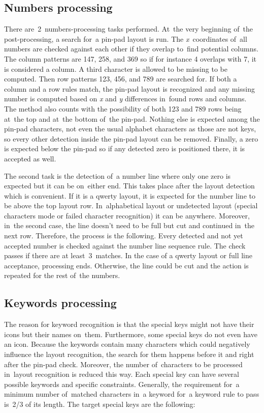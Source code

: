 \subsection{Numbers processing}
\label{postprocessing-numbers}
There are~2~numbers-processing tasks performed. At~the very beginning of~the post-processing, a search for~a pin-pad layout is run. The \emph{x}~coordinates of~all numbers are checked against each other if they overlap to~find potential columns. The column patterns are 147, 258, and 369 so if for instance 4 overlaps with 7, it is considered a column. A third character is allowed to be missing to be computed. Then row patterns 123, 456, and 789 are searched for. If both a column and a row rules match, the pin-pad layout is recognized and any missing number is computed based on \emph{x} and \emph{y} differences in~found rows and columns. The method also counts with the possibility of both 123 and 789 rows being at~the top and at~the bottom of~the pin-pad. Nothing else is expected among the pin-pad characters, not even the usual alphabet characters as those are not keys, so every other detection inside the pin-pad layout can be removed. Finally, a zero is expected below the pin-pad so if any detected zero is positioned there, it is accepted as well.

The second task is the detection of~a number line  where only one zero is expected but it can be on~either end. This takes place after the layout detection which is convenient. If it is a qwerty layout, it is expected for the number line to be above the top layout row. In~alphabetical layout or undetected layout (special characters mode or failed character recognition) it can be anywhere. Moreover, in~the second case, the line doesn't need to be full but cut and continued in~the next row. Therefore, the process is the following. Every detected and not yet accepted number is checked against the number line sequence rule. The check passes if there are at least~3~matches. In the case of a qwerty layout or full line acceptance, processing ends. Otherwise, the line could be cut and the action is repeated for the rest of~the numbers.

\subsection{Keywords processing}
\label{postprocessing-keywords}
The reason for keyword recognition is that the special keys might not have their icons but their names on~them. Furthermore, some special keys do not even have an icon. Because the keywords contain many characters which could negatively influence the layout recognition, the search for them happens before it and right after the pin-pad check. Moreover, the number of~characters to be processed in~layout recognition is reduced this way. Each special key can have several possible keywords and specific constraints. Generally, the requirement for~a minimum number of~matched characters in~a keyword for~a keyword rule to pass is~2/3 of its length. The target special keys are the following:

